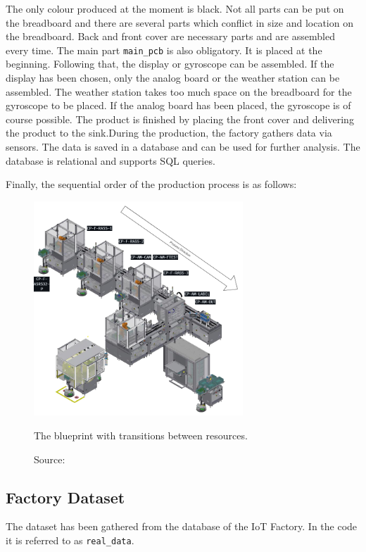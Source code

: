 The only colour produced at the moment is black. Not all parts can be put on the breadboard and there are several parts which conflict in size and location on the breadboard. Back and front cover are necessary parts and are assembled every time. The main part \texttt{main\_pcb} is also obligatory. It is placed at the beginning. Following that, the display or gyroscope can be assembled. If the display has been chosen, only the analog board or the weather station can be assembled. The weather station takes too much space on the breadboard for the gyroscope to be placed. If the analog board has been placed, the gyroscope is of course possible. The product is finished by placing the front cover and delivering the product to the sink.During the production, the factory gathers data via sensors. The data is saved in a database and can be used for further analysis. The database is relational and supports SQL queries.

Finally, the sequential order of the production process is as follows:

\begin{figure}[H]
  \centering
  \includegraphics[width=0.7\textwidth]{figures/processdirection.png}
  \caption[Production process]{The blueprint with transitions between resources.}
  \label{fig:transitions}
  \caption*{Source: \autocite{IoTFactory2024}}
\end{figure}

\subsection*{Factory Dataset}

The dataset has been gathered from the database of the IoT Factory. In the code it is referred to as \texttt{real\_data}.

